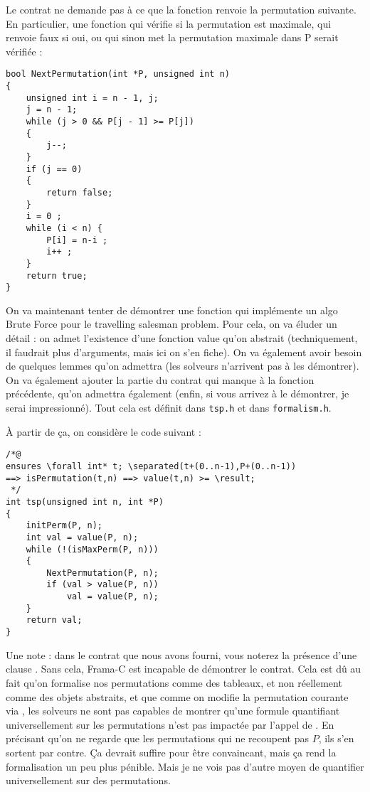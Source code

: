 \documentclass[11pt,answers]{exam}
\begin{document}
\begin{questions}
\begin{parts}
    \begin{solutionorbox}
        Le contrat ne demande pas à ce que la fonction renvoie la permutation suivante.
        En particulier, une fonction qui vérifie si la permutation est maximale, qui renvoie faux si oui, ou qui sinon met la permutation maximale
        dans P serait vérifiée : 

    \begin{lstlisting}
bool NextPermutation(int *P, unsigned int n)
{
    unsigned int i = n - 1, j;
    j = n - 1;
    while (j > 0 && P[j - 1] >= P[j])
    {
        j--;
    }
    if (j == 0)
    {
        return false;
    }
    i = 0 ;
    while (i < n) {
        P[i] = n-i ;
        i++ ;
    }
    return true;
}
    \end{lstlisting}
    \end{solutionorbox}

    \end{parts}


    On va maintenant tenter de démontrer une fonction qui implémente un algo Brute Force pour le travelling salesman problem.
    Pour cela, on va éluder un détail : on admet l’existence d’une fonction value qu’on abstrait (techniquement, il faudrait plus d’arguments, mais ici on s’en fiche). On va également avoir besoin de quelques lemmes qu’on admettra (les solveurs n’arrivent pas à les démontrer).
    On va également ajouter la partie du contrat qui manque à la fonction précédente, qu’on admettra également (enfin, si vous arrivez à le démontrer, je serai impressionné).
    Tout cela est définit dans \texttt{tsp.h} et dans \texttt{formalism.h}.

    À partir de ça, on considère le code suivant :

    \begin{lstlisting}
/*@
ensures \forall int* t; \separated(t+(0..n-1),P+(0..n-1))
==> isPermutation(t,n) ==> value(t,n) >= \result;
 */
int tsp(unsigned int n, int *P)
{
    initPerm(P, n);
    int val = value(P, n);
    while (!(isMaxPerm(P, n)))
    {
        NextPermutation(P, n);
        if (val > value(P, n))
            val = value(P, n);
    }
    return val;
}
    \end{lstlisting}

    Une note : dans le contrat que nous avons fourni, vous noterez la présence d’une clause \code{\\separated}. Sans cela, Frama-C est incapable de démontrer le contrat. Cela est dû au fait qu’on formalise nos permutations comme des tableaux, et non réellement comme des objets abstraits, et que comme on modifie la permutation courante via , les solveurs ne sont pas capables de montrer qu’une formule quantifiant universellement sur les permutations n’est pas impactée par l’appel de . En précisant qu’on ne regarde que les permutations qui ne recoupent pas $P$, ils s’en sortent par contre.
    Ça devrait suffire pour être convaincant, mais ça rend la formalisation un peu plus pénible. Mais je ne vois pas d’autre moyen de quantifier universellement sur des permutations.


\end{questions}
\end{document}
